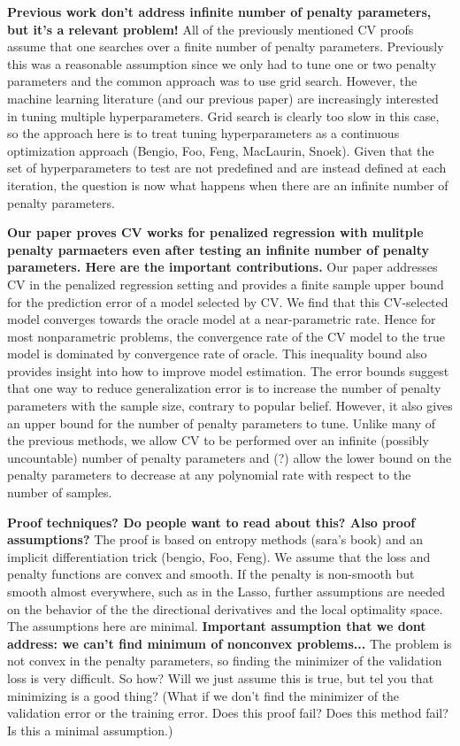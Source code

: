 \documentclass[12pt]{article}
\begin{document}
\textbf{Previous work don't address infinite number of penalty parameters, but it's a relevant problem!}
All of the previously mentioned CV proofs assume that one searches over a finite number of penalty parameters. Previously this was a reasonable assumption since we only had to tune one or two penalty parameters and the common approach was to use grid search. However, the machine learning literature (and our previous paper) are increasingly interested in tuning multiple hyperparameters. Grid search is clearly too slow in this case, so the approach here is to treat tuning hyperparameters as a continuous optimization approach (Bengio, Foo, Feng, MacLaurin, Snoek). Given that the set of hyperparameters to test are not predefined and are instead defined at each iteration, the question is now what happens when there are an infinite number of penalty parameters. 

\textbf{Our paper proves CV works for penalized regression with mulitple penalty parmaeters even after testing an infinite number of penalty parameters. Here are the important contributions.}
Our paper addresses CV in the penalized regression setting and provides a finite sample upper bound for the prediction error of a model selected by CV. We find that this CV-selected model converges towards the oracle model at a near-parametric rate. Hence for most nonparametric problems, the convergence rate of the CV model to the true model is dominated by convergence rate of oracle. This inequality bound also provides insight into how to improve model estimation. The error bounds suggest that one way to reduce generalization error is to increase the number of penalty parameters with the sample size, contrary to popular belief. However, it also gives an upper bound for the number of penalty parameters to tune.  Unlike many of the previous methods, we allow CV to be performed over an infinite (possibly uncountable) number of penalty parameters and (?) allow the lower bound on the penalty parameters to decrease at any polynomial rate with respect to the number of samples.

\textbf{Proof techniques? Do people want to read about this? Also proof assumptions?}
The proof is based on entropy methods (sara's book) and an implicit differentiation trick (bengio, Foo, Feng). We assume that the loss and penalty functions are convex and smooth. If the penalty is non-smooth but smooth almost everywhere, such as in the Lasso, further assumptions are needed on the behavior of the the directional derivatives and the local optimality space. The assumptions here are minimal. \textbf{Important assumption that we dont address: we can't find minimum of nonconvex problems...} The problem is not convex in the penalty parameters, so finding the minimizer of the validation loss is very difficult. So how? Will we just assume this is true, but tel you that minimizing is a good thing? (What if we don't find the minimizer of the validation error or the training error. Does this proof fail? Does this method fail? Is this a minimal assumption.)
\end{document}
